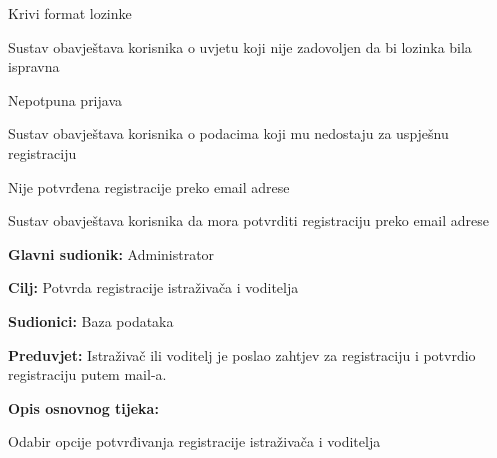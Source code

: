 \begin{packed_item}
\begin{packed_item}
							\item[3.b] Krivi format lozinke \begin{packed_enum}
								
								\item Sustav obavještava korisnika o uvjetu koji nije zadovoljen da bi lozinka bila ispravna
								
								\end{packed_enum}
							
							\item[3.c] Nepotpuna prijava \begin{packed_enum}
								
								\item Sustav obavještava korisnika o podacima koji mu nedostaju za uspješnu registraciju
								
								\end{packed_enum}
							
							\item[5.a] Nije potvrđena registracije preko email adrese \begin{packed_enum}
								
								\item Sustav obavještava korisnika da mora potvrditi registraciju preko email adrese
								
							\end{packed_enum}
							
						\end{packed_item}
						
					\end{packed_item}
					
					
					\noindent {}
					\begin{packed_item}
						
						\item \textbf{Glavni sudionik: }Administrator
						\item  \textbf{Cilj:} Potvrda registracije istraživača i voditelja
						\item  \textbf{Sudionici:} Baza podataka
						\item  \textbf{Preduvjet:} Istraživač ili voditelj je poslao zahtjev za registraciju i potvrdio registraciju putem mail-a.
						\item  \textbf{Opis osnovnog tijeka:}
						
						\item[] \begin{packed_enum}
							
							\item Odabir opcije potvrđivanja registracije istraživača i voditelja
							
						\end{packed_enum}
						
						
					\end{packed_item}
					
